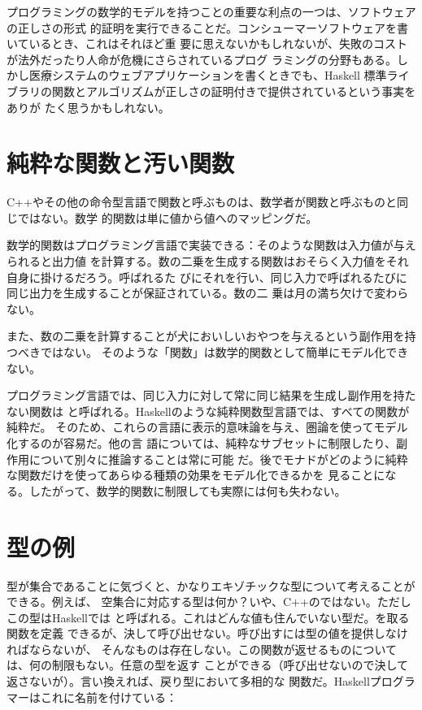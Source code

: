 プログラミングの数学的モデルを持つことの重要な利点の一つは、ソフトウェアの正しさの形式
的証明を実行できることだ。コンシューマーソフトウェアを書いているとき、これはそれほど重
要に思えないかもしれないが、失敗のコストが法外だったり人命が危機にさらされているプログ
ラミングの分野もある。しかし医療システムのウェブアプリケーションを書くときでも、Haskell
標準ライブラリの関数とアルゴリズムが正しさの証明付きで提供されているという事実をありが
たく思うかもしれない。

\section{純粋な関数と汚い関数}

C++やその他の命令型言語で関数と呼ぶものは、数学者が関数と呼ぶものと同じではない。数学
的関数は単に値から値へのマッピングだ。

数学的関数はプログラミング言語で実装できる：そのような関数は入力値が与えられると出力値
を計算する。数の二乗を生成する関数はおそらく入力値をそれ自身に掛けるだろう。呼ばれるた
びにそれを行い、同じ入力で呼ばれるたびに同じ出力を生成することが保証されている。数の二
乗は月の満ち欠けで変わらない。

また、数の二乗を計算することが犬においしいおやつを与えるという副作用を持つべきではない。
そのような「関数」は数学的関数として簡単にモデル化できない。

プログラミング言語では、同じ入力に対して常に同じ結果を生成し副作用を持たない関数は
と呼ばれる。Haskellのような純粋関数型言語では、すべての関数が純粋だ。
そのため、これらの言語に表示的意味論を与え、圏論を使ってモデル化するのが容易だ。他の言
語については、純粋なサブセットに制限したり、副作用について別々に推論することは常に可能
だ。後でモナドがどのように純粋な関数だけを使ってあらゆる種類の効果をモデル化できるかを
見ることになる。したがって、数学的関数に制限しても実際には何も失わない。

\section{型の例}

型が集合であることに気づくと、かなりエキゾチックな型について考えることができる。例えば、
空集合に対応する型は何か？いや、C++のではない。ただしこの型はHaskellでは
と呼ばれる。これはどんな値も住んでいない型だ。を取る関数を定義
できるが、決して呼び出せない。呼び出すには型の値を提供しなければならないが、
そんなものは存在しない。この関数が返せるものについては、何の制限もない。任意の型を返す
ことができる（呼び出せないので決して返さないが）。言い換えれば、戻り型において多相的な
関数だ。Haskellプログラマーはこれに名前を付けている：

